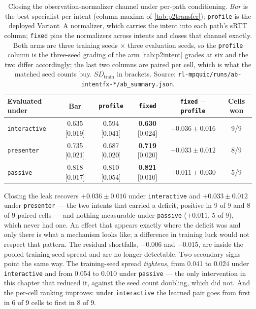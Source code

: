 \begin{table}[t]
  \centering
  \caption[Closing the observation-normalizer channel]{Closing the observation-normalizer channel under per-path conditioning. \emph{Bar} is the
  best specialist per intent (column maxima of \cref{tab:p2transfer}); \texttt{profile} is the deployed
  Variant~A normalizer, which carries the intent into each path's sRTT column; \texttt{fixed} pins the
  normalizers across intents and closes that channel exactly. Both arms are three training seeds
  $\times$ three evaluation seeds, so the \texttt{profile} column is the three-seed grading of the arm
  \cref{tab:p2intent} grades at six and the two differ accordingly; the last two columns are paired per
  cell, which is what the matched seed counts buy. $\mathit{SD}_{\mathrm{train}}$ in brackets. Source:
  \texttt{rl-mpquic/runs/ab-intentfx-*/ab\_summary.json}.}
  \label{tab:p2fixednorm}
  \small
  \setlength{\tabcolsep}{4pt}
  \begin{tabular}{lccccc}
    \toprule
    Evaluated under & Bar & \texttt{profile} & \texttt{fixed} & \texttt{fixed} $-$ \texttt{profile} & Cells won \\
    \midrule
    \texttt{interactive} & 0.635 [0.019] & 0.594 [0.041] & \textbf{0.630} [0.024] & $+0.036 \pm 0.016$ & 9/9 \\
    \texttt{presenter}   & 0.735 [0.021] & 0.687 [0.020] & \textbf{0.719} [0.020] & $+0.033 \pm 0.012$ & 8/9 \\
    \texttt{passive}     & 0.818 [0.017] & 0.810 [0.054] & \textbf{0.821} [0.010] & $+0.011 \pm 0.030$ & 5/9 \\
    \bottomrule
  \end{tabular}
\end{table}

Closing the leak recovers $+0.036 \pm 0.016$ under \texttt{interactive} and $+0.033 \pm 0.012$ under
\texttt{presenter} --- the two intents that carried a deficit, positive in 9 of 9 and 8 of 9 paired cells
--- and nothing measurable under \texttt{passive} ($+0.011$, 5 of 9), which never had one. An effect that
appears exactly where the deficit was and only there is what a mechanism looks like; a difference in
training luck would not respect that pattern. The residual shortfalls, $-0.006$ and $-0.015$, are inside
the pooled training-seed spread and are no longer detectable. Two secondary signs point the same way.
The training-seed spread \emph{tightens}, from 0.041 to 0.024 under \texttt{interactive} and from 0.054
to 0.010 under \texttt{passive} --- the only intervention in this chapter that reduced it, against the
seed count doubling, which did not. And the per-cell ranking improves: under \texttt{interactive} the
learned pair goes from first in 6 of 9 cells to first in 8 of 9.

